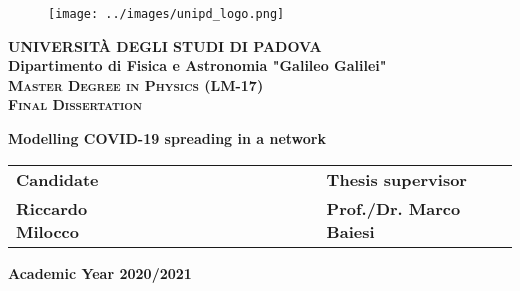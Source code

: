 \documentclass[a4paper,11pt,twoside]{book} %
\makeatletter
\renewcommand\tableofcontents{%
    \section*{\Huge{\contentsname}}%
    \@starttoc{toc}%
}
\makeatother
\begin{document}

\begin{titlepage}
\vspace{5mm}
\begin{figure}[hbtp]
\centering
\texttt{[image: ../images/unipd\_logo.png]}
\end{figure}
\vspace{5mm}
\begin{center}
{{\huge{\textsc{\bf UNIVERSIT\`A DEGLI STUDI DI PADOVA}}}\\}
\vspace{5mm}
{\Large{\bf Dipartimento di Fisica e Astronomia "Galileo Galilei"}} \\
\vspace{5mm}
{\Large{\textsc{\bf Master Degree in Physics (LM-17)}}}\\
\vspace{20mm}
{\Large{\textsc{\bf Final Dissertation}}}\\
\vspace{30mm}
\begin{spacing}{3}
{\LARGE \textbf{Modelling COVID-19 spreading in a network}}\\
\end{spacing}
\vspace{8mm}
\end{center}

\vspace{20mm}
\begin{spacing}{2}
\begin{tabular}{ l  c  c c c  cc c c c c  l }
{\Large{\bf Candidate}} &&&&&&&&&&& {\Large{\bf Thesis supervisor}}\\
{\Large{\bf Riccardo Milocco}} &&&&&&&&&&& {\Large{\bf Prof./Dr. Marco Baiesi}}\\
\end{tabular}
\end{spacing}
\vspace{15 mm}

\begin{center}
{\Large{\bf Academic Year 2020/2021}}
\end{center}
\end{titlepage}

\restoregeometry

\clearpage{\pagestyle{empty}\cleardoublepage}

\pagestyle{empty}

\vspace*{\fill}
\tableofcontents
\vspace*{\fill}
\end{document}

